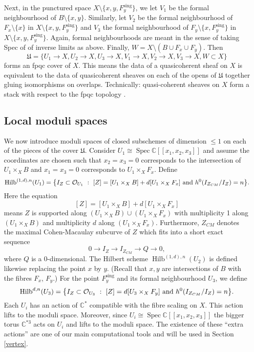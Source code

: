 \documentclass{amsart}
\theoremstyle{definition}
\newcommand{\CC} {\mathbb{C}}          %
\renewcommand{\O}{\mathcal{O}}
\newcommand{\Hilb}{\operatorname{Hilb}}
\newcommand{\Spec}{\operatorname{Spec}}
\newcommand{\sing}{\operatorname{sing}}
\begin{document}
Next, in the punctured space $X \setminus \{x,y,F_{y}^{\sing}\}$, we let $V_1$ be the formal neighbourhood of $B \setminus \{x,y\}$. Similarly, let $V_2$ be the formal neighbourhood of $F_x \setminus \{x\}$ in $X \setminus \{x,y,F_{y}^{\sing}\}$ and $V_3$ the formal neighbourhood of $F_y \setminus \{x, F_{y}^{\sing}\}$ in $X \setminus \{x,y,F_{y}^{\sing}\}$. Again, formal neighbourhoods are meant in the sense of taking Spec of of inverse limits as above. Finally, $W = X \setminus (B \cup F_x \cup F_y)$. Then
$$
\mathfrak{U} = \{U_1 \rightarrow X, U_2 \rightarrow X, U_3 \rightarrow X, V_1 \rightarrow X, V_2 \rightarrow X, V_3 \rightarrow X, W \subset X\}
$$
forms an fpqc cover of $X$. This means the data of a quasicoherent sheaf on $X$ is equivalent to the data of quasicoherent sheaves on each of the opens of $\mathfrak{U}$ together gluing isomorphisms on overlaps. Technically: quasi-coherent sheaves on $X$ form a stack with respect to the fpqc topology \cite[Thm.~4.23]{Vis}.


\subsection{Local moduli spaces} \label{localmod}

We now introduce moduli spaces of closed subschemes of dimension $\leq 1$ on each of the pieces of the cover $\mathfrak{U}$. Consider $U_1 \cong \Spec \CC[\![ x_1,x_2,x_3]\!]$ and assume the coordinates are chosen such that $x_2=x_3=0$ corresponds to the intersection of $U_1 \times_X B$ and $x_1=x_3=0$ corresponds to $U_1 \times_X F_x$. Define
$$
\Hilb^{(1,d),n}(U_1) = \big\{ I_Z \subset \O_{U_1} \ : \ [Z] = [U_1 \times_X B] + d [U_1 \times_X F_x] \ {\rm{and}} \ h^0(I_{Z_{CM}} / I_Z) = n \big\}.
$$
Here the equation
$$
[Z] = [U_1 \times_X B] + d [U_1 \times_X F_x]
$$
means $Z$ is supported along $(U_1 \times_X B) \cup (U_1 \times_X F_x)$ with multiplicity 1 along $(U_1 \times_X B)$ and multiplicity $d$ along $(U_1 \times_X F_x)$. Furthermore, $Z_{CM}$ denotes the maximal Cohen-Macaulay subcurve of $Z$ which fits into a short exact sequence
$$
0 \longrightarrow I_{Z} \longrightarrow I_{Z_{CM}} \longrightarrow Q \longrightarrow 0, 
$$
where $Q$ is a 0-dimensional. The Hilbert scheme $\Hilb^{(1,d),n}(U_2)$ is defined likewise replacing the point $x$ by $y$. (Recall that $x,y$ are intersections of $B$ with the fibres $F_x$, $F_y$.) For the point $F_{y}^{\sing}$ and its formal neighbourhood $U_3$, we define
$$
\Hilb^{d,n}(U_3) = \big\{ I_Z \subset \O_{U_3} \ : \ [Z] = d [U_3 \times_X F_y] \ {\rm{and}} \ h^0(I_{Z_{CM}} / I_Z) = n \big\}.
$$
Each $U_i$ has an action of $\CC^*$ compatible with the fibre scaling on $X$. This action lifts to the moduli space. Moreover, since $U_i \cong \Spec \CC[\![x_1,x_2,x_3]\!]$ the bigger torus $\CC^{*3}$ acts on $U_i$ and lifts to the moduli space. The existence of these ``extra actions'' are one of our main computational tools and will be used in Section \ref{vertex}.
\end{document}
